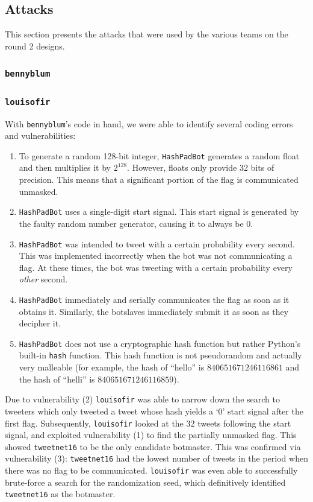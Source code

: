 \documentclass[11pt, oneside]{article} %
\numberwithin{equation}{section} %
\numberwithin{figure}{section} %
\numberwithin{table}{section} %
\renewcommand{\c}[1]{\texttt{#1}}
\newcommand{\teambb}{\c{bennyblum}}
\newcommand{\teamol}{\c{louisofir}}
\begin{document}
	\subsection{Attacks}
		This section presents the attacks that were used by the various teams on the round 2 designs.

		\subsubsection{\teambb{}}

		\subsubsection{\teamol{}}
			With \teambb{}'s code in hand, we were able to identify several coding errors and vulnerabilities:  
			\begin{enumerate}
				\item To generate a random 128-bit integer, \c{HashPadBot} generates a random float and then multiplies it by $2^{128}$.  However, floats only provide 32 bits of precision.  This means that a significant portion of the flag is communicated unmasked.
				\item \c{HashPadBot} uses a single-digit start signal.  This start signal is generated by the faulty random number generator, causing it to always be $0$.
				\item \c{HashPadBot} was intended to tweet with a certain probability every second.  This was implemented incorrectly when the bot was not communicating a flag.  At these times, the bot was tweeting with a certain probability every \emph{other} second.
				\item \c{HashPadBot} immediately and serially communicates the flag as soon as it obtains it.  Similarly, the botslaves immediately submit it as soon as they decipher it.
				\item \c{HashPadBot} does not use a cryptographic hash function but rather Python's built-in \c{hash} function.  This hash function is not pseudorandom and actually very malleable (for example, the hash of ``hello'' is $840651671246116861$ and the hash of ``helli'' is $840651671246116859$).
			\end{enumerate}
			Due to vulnerability (2) \teamol{} was able to narrow down the search to tweeters which only tweeted a tweet whose hash yields a `0' start signal after the first flag.  Subsequently, \teamol{} looked at the 32 tweets following the start signal, and exploited vulnerability (1) to find the partially unmasked flag.  This showed \c{tweetnet16} to be the only candidate botmaster.  This was confirmed via vulnerability (3): \c{tweetnet16} had the lowest number of tweets in the period when there was no flag to be communicated.  \teamol{} was even able to successfully brute-force a search for the randomization seed, which definitively identified \c{tweetnet16} as the botmaster.
\end{document}
